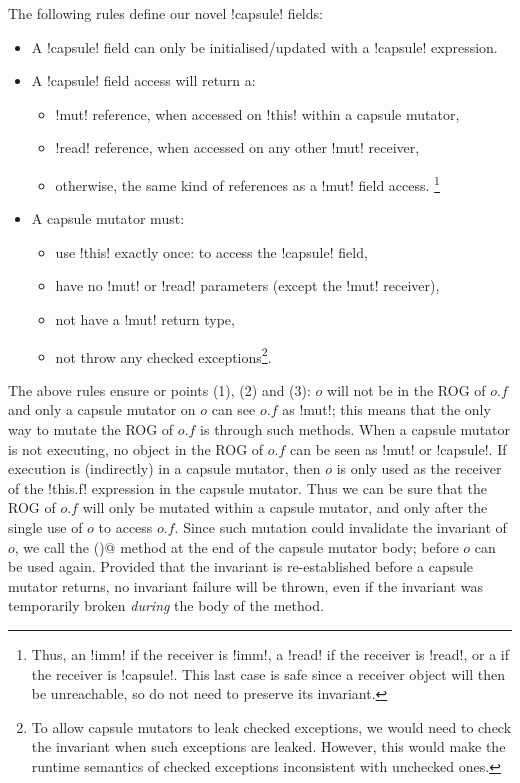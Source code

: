 The following rules define our novel \Q!capsule! fields:
\begin{itemize}
\item A \Q!capsule! field can only be initialised/updated with a \Q!capsule! expression.
\item A \Q!capsule! field access will return a:
\begin{itemize}
\item \Q!mut! reference, when accessed on \Q!this! within a capsule mutator,
\item \Q!read! reference, when accessed on any other \Q!mut! receiver,
\item otherwise, the same kind of references as a \Q!mut! field access.
\footnote{Thus, 
an \Q!imm! if the receiver is \Q!imm!, a \Q!read! if the receiver is \Q!read!, or a \Q@capsule@ if the receiver is
\Q!capsule!. This last case is safe since a \Q@capsule@ receiver object will then be unreachable, so do not need to preserve its invariant.}
\end{itemize}
\item A capsule mutator must:
\begin{itemize}
\item use \Q!this! exactly once: to access the \Q!capsule! field,
\item have no \Q!mut! or \Q!read! parameters (except the \Q!mut! receiver),
\item not have a \Q!mut! return type,
\item not throw any checked exceptions\footnote{To allow capsule mutators to leak checked exceptions, we would need to check the invariant when such exceptions are leaked. However, this would make the runtime semantics of checked exceptions inconsistent with unchecked ones.}.
\end{itemize}
\end{itemize}	
	
\noindent The above rules ensure or points (1), (2) and (3):
$o$ will not be in the ROG of $o.f$ and
only a capsule mutator on $o$ can see $o.f$ as \Q!mut!; this means that the only way to mutate the ROG of $o.f$ is through such methods. When a capsule mutator is not executing, no object in the ROG of $o.f$ can be seen as \Q!mut! or \Q!capsule!. %
If execution is (indirectly) in a capsule mutator, then $o$ is only used as the receiver of the \Q!this.f! expression in the capsule mutator.
Thus we can be sure that the ROG of $o.f$ will only be mutated within a capsule mutator, and only after the single use of $o$ to access $o.f$.
Since such mutation could invalidate the invariant of $o$, we call the \Q@invariant()@ method at the end of the capsule mutator body; before $o$ can be used again. Provided that the invariant is re-established before a capsule mutator returns, no invariant failure will be thrown, even if the invariant was temporarily broken \emph{during} the body of the method.

